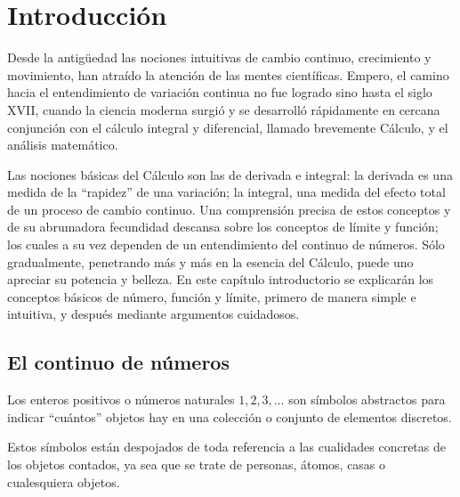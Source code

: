 \documentclass[12pt]{book}
\theoremstyle{definition}
\begin{document}
\chapter{Introducción}

Desde la antigüedad las nociones intuitivas de cambio continuo, crecimiento y movimiento, han atraído la atención de las mentes científicas. Empero, el camino hacia el entendimiento de variación continua no fue logrado sino hasta el siglo XVII, cuando la ciencia moderna surgió y se desarrolló rápidamente en cercana conjunción con el cálculo integral y diferencial, llamado brevemente Cálculo, y el análisis matemático.

Las nociones básicas del Cálculo son las de derivada e integral: la derivada es una medida de la ``rapidez'' de una variación; la integral, una medida del efecto total de un proceso de cambio continuo. Una comprensión precisa de estos conceptos y de su abrumadora fecundidad descansa sobre los conceptos de límite y función; los cuales a su vez dependen de un entendimiento del continuo de números. Sólo gradualmente, penetrando más y más en la esencia del Cálculo, puede uno apreciar su potencia y belleza. En este capítulo introductorio se explicarán los conceptos básicos de número, función y límite, primero de manera simple e intuitiva, y después mediante argumentos cuidadosos.

\section{El continuo de números}

Los enteros positivos o números naturales $1, 2, 3, \dots$ son símbolos abstractos para indicar ``cuántos'' objetos hay en una colección o conjunto de elementos discretos.

Estos símbolos están despojados de toda referencia a las cualidades concretas de los objetos contados, ya sea que se trate de personas, átomos, casas o cualesquiera objetos.
\end{document}
